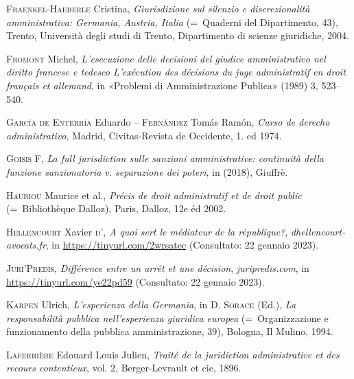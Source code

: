 \documentclass[12pt,it,a4paper,]{report}
\newlength{\cslhangindent}
\newenvironment{CSLReferences}[2] %
 {%
  \setlength{\parindent}{0pt}
  \ifodd #1 \everypar{\setlength{\hangindent}{\cslhangindent}}\ignorespaces\fi
  \ifnum #2 > 0
  \setlength{\parskip}{#2\baselineskip}
  \fi
 }%
 {}
\begin{document}
\begin{CSLReferences}{1}{0}
\leavevmode{}%
\textsc{Fraenkel-Haeberle} Cristina, \emph{Giurisdizione sul silenzio e
discrezionalità amministrativa: Germania, Austria, Italia} (=~Quaderni
del Dipartimento, 43), Trento, Università degli studi di Trento,
Dipartimento di scienze giuridiche, 2004.

\leavevmode{}%
\textsc{Fromont} Michel, \emph{L'esecuzione delle decisioni del giudice
amministrativo nel diritto francese e tedesco L'exécution des décisions
du juge administratif en droit français et allemand}, in {«Problemi di
Amministrazione Publica»} (1989) 3, 523--540.

\leavevmode{}%
\textsc{García de Enterría} Eduardo -- \textsc{Fernández} Tomás Ramón,
\emph{Curso de derecho administrativo}, Madrid, Civitas-Revista de
Occidente, 1. ed 1974.

\leavevmode{}%
\textsc{Goisis} F, \emph{La full jurisdiction sulle sanzioni
amministrative: continuità della funzione sanzionatoria v. separazione
dei poteri}, in (2018), Giuffrè.

\leavevmode{}%
\textsc{Hauriou} Maurice et al., \emph{Précis de droit administratif et
de droit public} (=~Bibliothèque Dalloz), Paris, Dalloz, 12e éd 2002.

\leavevmode{}%
\textsc{Hellencourt} Xavier \textsc{d'}, \emph{A quoi sert le médiateur
de la république?}, \emph{dhellencourt-avocats.fr}, in
\url{https://tinyurl.com/2wrsatec} (Consultato: 22 gennaio 2023).

\leavevmode{}%
\textsc{Juri'Predis}, \emph{Différence entre un arrêt et une décision},
\emph{juripredis.com}, in \url{https://tinyurl.com/ye22pd59}
(Consultato: 22 gennaio 2023).

\leavevmode{}%
\textsc{Karpen} Ulrich, \emph{L'esperienza della Germania}, in D.
\textsc{Sorace} (Ed.), \emph{La responsabilità pubblica nell'esperienza
giuridica europea} (=~Organizzazione e funzionamento della pubblica
amministrazione, 39), Bologna, Il Mulino, 1994.

\leavevmode{}%
\textsc{Laferrière} Edouard Louis Julien, \emph{Traité de la juridiction
administrative et des recours contentieux}, vol. 2, Berger-Levrault et
cie, 1896.


\end{CSLReferences}
\end{document}
